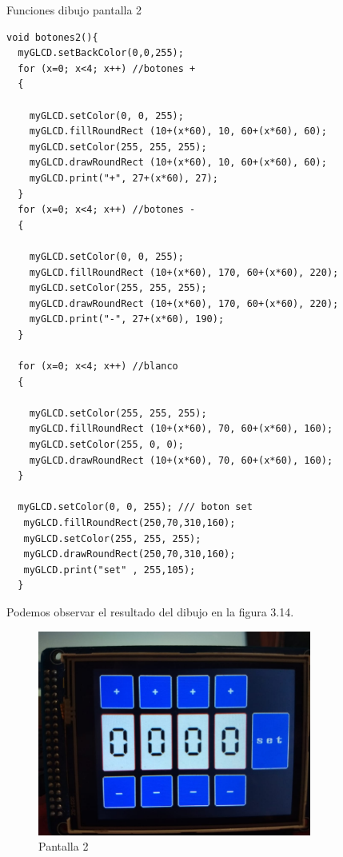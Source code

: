 Funciones dibujo pantalla 2

\begin{verbatim}
void botones2(){
  myGLCD.setBackColor(0,0,255);
  for (x=0; x<4; x++) //botones +
  {
  
    myGLCD.setColor(0, 0, 255);
    myGLCD.fillRoundRect (10+(x*60), 10, 60+(x*60), 60);
    myGLCD.setColor(255, 255, 255);
    myGLCD.drawRoundRect (10+(x*60), 10, 60+(x*60), 60);
    myGLCD.print("+", 27+(x*60), 27);
  }
  for (x=0; x<4; x++) //botones -
  {
  
    myGLCD.setColor(0, 0, 255);
    myGLCD.fillRoundRect (10+(x*60), 170, 60+(x*60), 220);
    myGLCD.setColor(255, 255, 255);
    myGLCD.drawRoundRect (10+(x*60), 170, 60+(x*60), 220);
    myGLCD.print("-", 27+(x*60), 190);
  }

  for (x=0; x<4; x++) //blanco 
  {
  
    myGLCD.setColor(255, 255, 255);
    myGLCD.fillRoundRect (10+(x*60), 70, 60+(x*60), 160);
    myGLCD.setColor(255, 0, 0);
    myGLCD.drawRoundRect (10+(x*60), 70, 60+(x*60), 160);
  }

  myGLCD.setColor(0, 0, 255); /// boton set
   myGLCD.fillRoundRect(250,70,310,160);
   myGLCD.setColor(255, 255, 255);
   myGLCD.drawRoundRect(250,70,310,160);
   myGLCD.print("set" , 255,105);
  }
\end{verbatim}

Podemos observar el resultado del dibujo en la figura 3.14.

\begin{figure}[H]
\centering
\includegraphics[width=9cm]{Capitulo3/figs/pantalla2.jpg}
\caption{Pantalla 2}
\end{figure}

